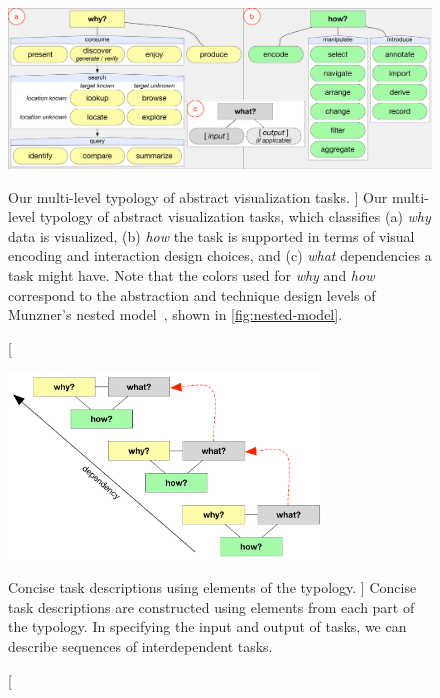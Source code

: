 
\begin{figure}
    \centering
    \includegraphics[width=\textwidth]{figures/typology.pdf}
    \caption
    [
        Our multi-level typology of abstract visualization tasks.
    ]
    {
        Our multi-level typology of abstract visualization tasks, which classifies  (a) {\it why} data is visualized, (b) {\it how} the task is supported in terms of visual encoding and interaction design choices, and (c) {\it what} dependencies a task might have. Note that the colors used for {\it why} and {\it how} correspond to the abstraction and technique design levels of Munzner's nested model~\cite{Munzner2009}, shown in \autoref{fig:nested-model}.
    }
    \centering
	\label{fig:typology}
\end{figure}



\begin{figure}
    \centering
    \includegraphics[width=0.75\textwidth]{figures/typology-dependency-eps-converted-to.pdf}
    \caption
    [
        Concise task descriptions using elements of the typology.
    ]{
        Concise task descriptions are constructed using elements from each part of the typology. In specifying the input and output of tasks, we can describe sequences of interdependent tasks.
    }
    \centering
    \label{fig:typology-dep}
\end{figure}

